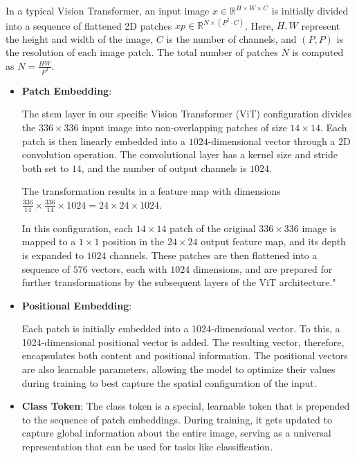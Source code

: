 \documentclass[a4paper,12pt,openright]{book}
\begin{document}
In a typical Vision Transformer, an input image \( x \in \mathbb{R}^{H \times W \times C} \) is initially divided into a sequence of flattened 2D patches \( xp \in \mathbb{R}^{N \times (P^2 \cdot C)} \). Here, \( H, W \) represent the height and width of the image, \( C \) is the number of channels, and \( (P, P) \) is the resolution of each image patch. The total number of patches \( N \) is computed as \( N = \frac{HW}{P^2} \).

\begin{itemize}
   \item \textbf{Patch Embedding}:
    
    The stem layer in our specific Vision Transformer (ViT) configuration divides the \(336 \times 336\) input image into non-overlapping patches of size \(14 \times 14\). Each patch is then linearly embedded into a \(1024\)-dimensional vector through a 2D convolution operation. The convolutional layer has a kernel size and stride both set to \(14\), and the number of output channels is \(1024\).
    
    The transformation results in a feature map with dimensions \(\frac{336}{14} \times \frac{336}{14} \times 1024 = 24 \times 24 \times 1024\).
    
    In this configuration, each \(14 \times 14\) patch of the original \(336 \times 336\) image is mapped to a \(1 \times 1\) position in the \(24 \times 24\) output feature map, and its depth is expanded to \(1024\) channels. These patches are then flattened into a sequence of 
    \(576\) vectors, each with \(1024\) dimensions, and are prepared for further transformations by the subsequent layers of the ViT architecture."

    
    \item \textbf{Positional Embedding}:

    
    Each patch is initially embedded into a 1024-dimensional vector. To this, a 1024-dimensional positional vector is added. The resulting vector, therefore, encapsulates both content and positional information. The positional vectors are also learnable parameters, allowing the model to optimize their values during training to best capture the spatial configuration of the input.
    

    \item \textbf{Class Token}: The class token is a special, learnable token that is prepended to the sequence of patch embeddings. During training, it gets updated to capture global information about the entire image, serving as a universal representation that can be used for tasks like classification. 
    

\end{itemize}
\end{document}
